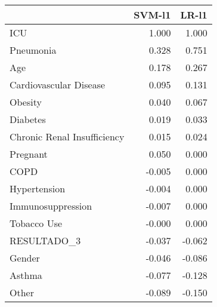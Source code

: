 \begin{tabular}{lrr}
\toprule
{} &  SVM-l1 &  LR-l1 \\
\midrule
ICU                         &   1.000 &  1.000 \\
Pneumonia                   &   0.328 &  0.751 \\
Age                         &   0.178 &  0.267 \\
Cardiovascular Disease      &   0.095 &  0.131 \\
Obesity                     &   0.040 &  0.067 \\
Diabetes                    &   0.019 &  0.033 \\
Chronic Renal Insufficiency &   0.015 &  0.024 \\
Pregnant                    &   0.050 &  0.000 \\
COPD                        &  -0.005 &  0.000 \\
Hypertension                &  -0.004 &  0.000 \\
Immunosuppression           &  -0.007 &  0.000 \\
Tobacco Use                 &  -0.000 &  0.000 \\
RESULTADO\_3                 &  -0.037 & -0.062 \\
Gender                      &  -0.046 & -0.086 \\
Asthma                      &  -0.077 & -0.128 \\
Other                       &  -0.089 & -0.150 \\
\bottomrule
\end{tabular}
